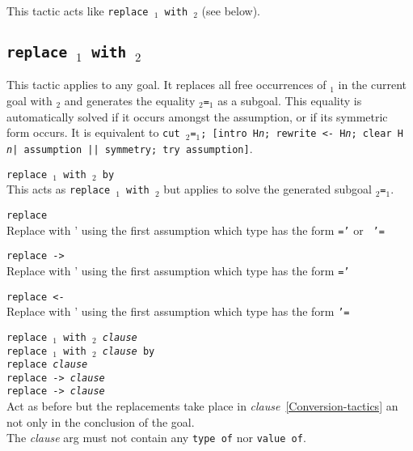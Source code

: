 This tactic acts like {\tt replace {\term$_1$} with {\term$_2$}}
(see below).

\subsection{\tt replace {\term$_1$} with {\term$_2$}
\label{tactic:replace}
}

This tactic applies to any goal. It replaces all free occurrences of
{\term$_1$} in the current goal with {\term$_2$} and generates the
equality {\term$_2$}{\tt =}{\term$_1$} as a subgoal. This equality is
automatically solved if it occurs amongst the assumption, or if its
symmetric form occurs.  It is equivalent to {\tt cut
\term$_2$=\term$_1$; [intro H{\sl n}; rewrite <- H{\sl n}; clear H{\sl
n}| assumption || symmetry; try assumption]}.

\begin{ErrMsgs}
\item {}
\end{ErrMsgs}

\begin{Variants}
\item {\tt replace {\term$_1$} with {\term$_2$} by \tac}\\ This acts
  as {\tt replace {\term$_1$} with {\term$_2$}} but applies {\tt \tac}
  to solve the generated subgoal {\tt \term$_2$=\term$_1$}.
\item {\tt replace {\term}}\\ Replace {\term} with {\term'} using the
  first assumption which type has the form {\tt \term=\term'} or {\tt
    \term'=\term}
\item {\tt replace -> {\term}}\\ Replace {\term} with {\term'} using the
  first assumption which type has the form {\tt \term=\term'}
\item {\tt replace <- {\term}}\\ Replace {\term} with {\term'} using the
  first assumption which type has the form {\tt \term'=\term}
\item {\tt replace {\term$_1$} with {\term$_2$} \textit{clause} }\\
    {\tt replace {\term$_1$} with {\term$_2$} \textit{clause} by \tac }\\ 
    {\tt replace {\term} \textit{clause}}\\ 
    {\tt replace -> {\term} \textit{clause}}\\ 
    {\tt replace -> {\term} \textit{clause}}\\ 
    Act as before but the replacements take place in \textit{clause}~\ref{Conversion-tactics} an not only in the conclusion of the goal.\\
    The  \textit{clause} arg must  not contain  any \texttt{type  of} nor  \texttt{value  of}.
\end{Variants}

